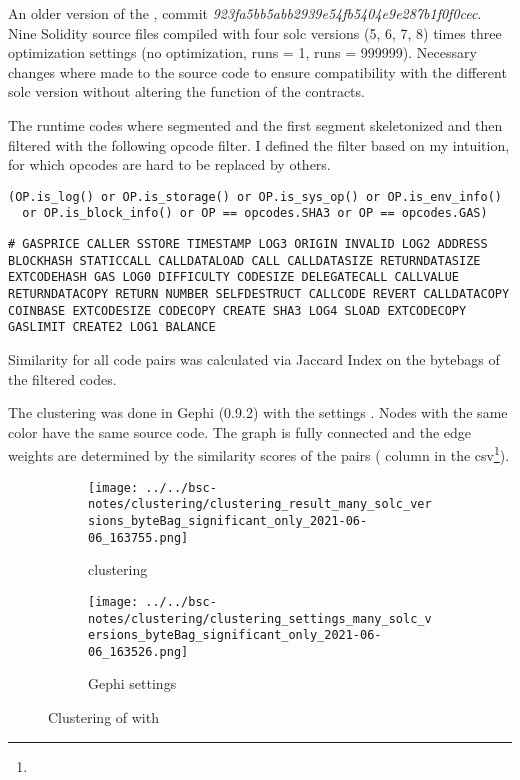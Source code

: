 \documentclass[../main.tex]{subfiles}
\begin{document}
An older version of the , commit \textit{923fa5bb5abb2939e54fb5404e9e287b1f0f0cec}.
Nine Solidity source files compiled with four solc versions (5, 6, 7, 8) times three optimization
settings (no optimization, runs = 1, runs = 999999).
Necessary changes where made to the source code to ensure compatibility with the different solc
version without altering the function of the contracts.

The runtime codes where segmented and the first segment skeletonized and then filtered with the following opcode filter. I defined the filter based on my intuition, for which opcodes are hard to be replaced by others.
\begin{lstlisting}[style=pymd]
(OP.is_log() or OP.is_storage() or OP.is_sys_op() or OP.is_env_info()
  or OP.is_block_info() or OP == opcodes.SHA3 or OP == opcodes.GAS)
\end{lstlisting}
\begin{lstlisting}[style=pysm]
# GASPRICE CALLER SSTORE TIMESTAMP LOG3 ORIGIN INVALID LOG2 ADDRESS BLOCKHASH STATICCALL CALLDATALOAD CALL CALLDATASIZE RETURNDATASIZE EXTCODEHASH GAS LOG0 DIFFICULTY CODESIZE DELEGATECALL CALLVALUE RETURNDATACOPY RETURN NUMBER SELFDESTRUCT CALLCODE REVERT CALLDATACOPY COINBASE EXTCODESIZE CODECOPY CREATE SHA3 LOG4 SLOAD EXTCODECOPY GASLIMIT CREATE2 LOG1 BALANCE
\end{lstlisting}

Similarity for all code pairs was calculated via Jaccard Index on the bytebags of the filtered codes.

The clustering  was done in Gephi (0.9.2) with the settings .
Nodes with the same color have the same source code.
The graph is fully connected and the edge weights are determined by the similarity scores of the pairs ( column in the csv\footnote{}).

\begin{figure}[ht!]
  \begin{subfigure}[c]{.6\linewidth}
    \texttt{[image: ../../bsc-notes/clustering/clustering\_result\_many\_solc\_versions\_byteBag\_significant\_only\_2021-06-06\_163755.png]}
    \caption{clustering}
    \label{fig:solc_bytebag_cluster}
  \end{subfigure}%
  \begin{subfigure}[c]{.4\linewidth}
    \texttt{[image: ../../bsc-notes/clustering/clustering\_settings\_many\_solc\_versions\_byteBag\_significant\_only\_2021-06-06\_163526.png]}
    \caption{Gephi settings}
    \label{fig:solc_bytebag_cluster_settings}
  \end{subfigure}
  \caption{Clustering of \n{\solcts} with }
\end{figure}
\end{document}
